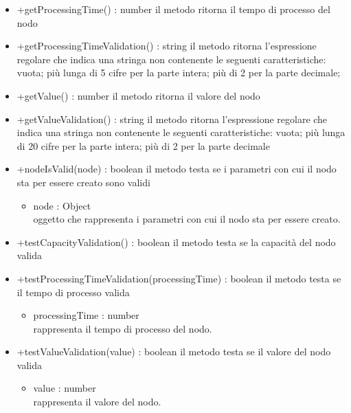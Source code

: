 \begin{itemize}
\begin{itemize}
		\item +getProcessingTime() : number\newline
		il metodo ritorna il tempo di processo del nodo
		\item +getProcessingTimeValidation() : string\newline
		il metodo ritorna l'espressione regolare che indica una stringa non contenente le seguenti caratteristiche: vuota; più lunga di 5 cifre per la parte intera; più di 2 per la parte decimale;
		\item +getValue() : number\newline
		il metodo ritorna il valore del nodo
		\item +getValueValidation() : string\newline
		il metodo ritorna l'espressione regolare che indica una stringa non contenente le seguenti caratteristiche: vuota; più lunga di 20 cifre per la parte intera; più di 2 per la parte decimale
		\item +nodeIsValid(node) : boolean\newline
		il metodo testa se i parametri con cui il nodo sta per essere creato sono validi
		\begin{itemize}
			\item node : Object\\
			oggetto che rappresenta i parametri con cui il nodo sta per essere creato.
		\end{itemize}
		\item +testCapacityValidation() : boolean\newline
		il metodo testa se la capacità del nodo valida
		\item +testProcessingTimeValidation(processingTime) : boolean\newline
		il metodo testa se il tempo di processo valida
		\begin{itemize}
			\item processingTime : number\\
			rappresenta il tempo di processo del nodo.
		\end{itemize}
		\item +testValueValidation(value) : boolean\newline
		il metodo testa se il valore del nodo valida
		\begin{itemize}
			\item value : number\\
			rappresenta il valore del nodo.
		\end{itemize}
	\end{itemize}
\end{itemize}
